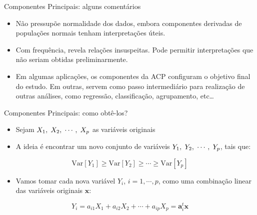 \documentclass[
  ignorenonframetext,
  aspectratio=169,
]{beamer}
\providecommand{\tightlist}{%
  \setlength{\itemsep}{0pt}\setlength{\parskip}{0pt}}
\begin{document}
\begin{frame}{Componentes Principais: alguns comentários}
\label{componentes-principais-alguns-comentuxe1rios}
\begin{itemize}
\tightlist
\item
  Não pressupõe normalidade dos dados, embora componentes derivadas de
  populações normais tenham interpretações úteis.
\end{itemize}

\pause

\begin{itemize}
\tightlist
\item
  Com frequência, revela relações insuspeitas. Pode permitir
  interpretações que não seriam obtidas preliminarmente.
\end{itemize}

\pause

\begin{itemize}
\tightlist
\item
  Em algumas aplicações, os componentes da ACP configuram o objetivo
  final do estudo. Em outras, servem como passo intermediário para
  realização de outras análises, como regressão, classificação,
  agrupamento, etc\ldots{}
\end{itemize}
\end{frame}

\begin{frame}{Componentes Principais: como obtê-los?}
\label{componentes-principais-como-obtuxea-los}
\begin{itemize}
\tightlist
\item
  Sejam
  \(X_1, \hspace{0.1cm} X_2, \hspace{0.1cm} \cdots, \hspace{0.1cm} X_p\)
  as variáveis originais
\end{itemize}

\pause

\begin{itemize}
\tightlist
\item
  A ideia é encontrar um novo conjunto de variáveis
  \(Y_1, \hspace{0.1cm} Y_2, \hspace{0.1cm} \cdots, \hspace{0.1cm} Y_p\),
  tais que:
\end{itemize}

\[\textrm{Var}[Y_1] \geqslant \textrm{Var}[Y_2] \geqslant \cdots \geqslant \textrm{Var}[Y_p]\]

\pause

\begin{itemize}
\tightlist
\item
  Vamos tomar cada nova variável \(Y_i\), \(i = 1, \cdots, p\), como uma
  combinação linear das variáveis originais \(\mathbf{x}\):
\end{itemize}

\[Y_i = a_{i1}X_1 + a_{i2}X_2 + \cdots + a_{ip}X_p = \mathbf{a}_i^t \mathbf{x}\]
\end{frame}
\end{document}
